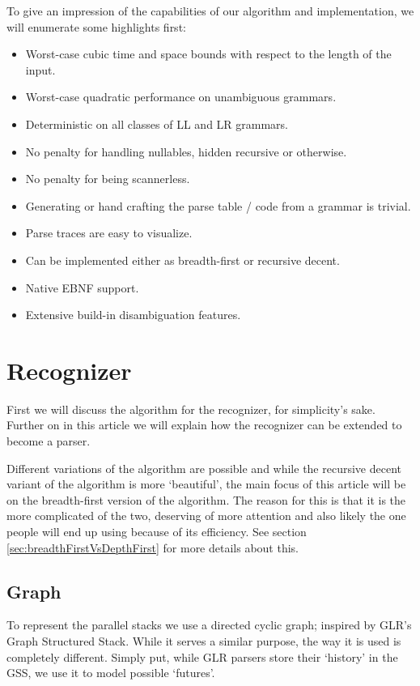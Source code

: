 \documentclass[a4paper,10pt]{article}
\begin{document}
To give an impression of the capabilities of our algorithm and implementation, we will enumerate some highlights first:
\begin{itemize}
 \setlength{\itemsep}{0pt}
 \setlength{\parskip}{0pt}
 \setlength{\parsep}{0pt}
 
 \item Worst-case cubic time and space bounds with respect to the length of the input.
 \item Worst-case quadratic performance on unambiguous grammars.
 \item Deterministic on all classes of LL and LR\cite{knuth1965translation} grammars.
 \item No penalty for handling nullables, hidden recursive or otherwise.
 \item No penalty for being scannerless.
 \item Generating or hand crafting the parse table / code from a grammar is trivial.
 \item Parse traces are easy to visualize.
 \item Can be implemented either as breadth-first or recursive decent.
 \item Native EBNF support.
 \item Extensive build-in disambiguation features.
\end{itemize}

\pagebreak
\section{Recognizer}

First we will discuss the algorithm for the recognizer, for simplicity's sake. Further on in this article we will explain how the recognizer can be extended to become a parser.

Different variations of the algorithm are possible and while the recursive decent variant of the algorithm is more `beautiful', the main focus of this article will be on the breadth-first version of the algorithm. The reason for this is that it is the more complicated of the two, deserving of more attention and also likely the one people will end up using because of its efficiency. See section \ref{sec:breadthFirstVsDepthFirst} for more details about this.

\subsection{Graph}

To represent the parallel stacks we use a directed cyclic graph; inspired by GLR's Graph Structured Stack. While it serves a similar purpose, the way it is used is completely different. Simply put, while GLR parsers store their `history' in the GSS\cite{tomita1985efficient}, we use it to model possible `futures'.
\end{document}
